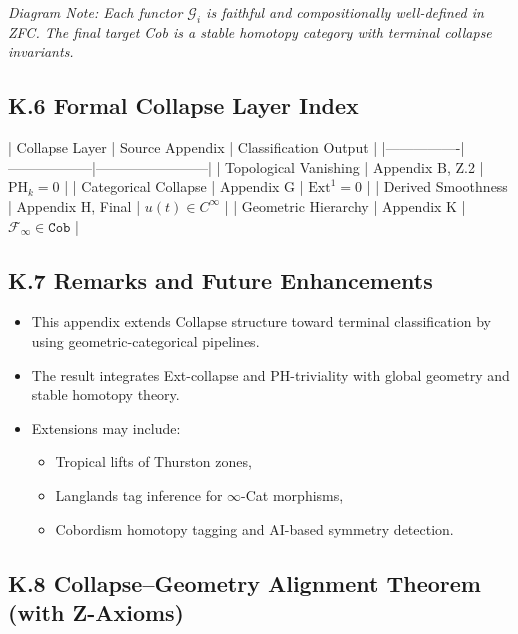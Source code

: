 \documentclass[11pt]{article}
\begin{document}
\begin{axiom}
\begin{axiom}
\textit{Diagram Note: Each functor \( \mathcal{G}_i \) is faithful and compositionally well-defined in ZFC.  
The final target Cob is a stable homotopy category with terminal collapse invariants.}

\subsection*{K.6 Formal Collapse Layer Index}

| Collapse Layer | Source Appendix | Classification Output |
|----------------|------------------|------------------------|
| Topological Vanishing | Appendix B, Z.2 | \( \mathrm{PH}_k = 0 \) |
| Categorical Collapse | Appendix G | \( \mathrm{Ext}^1 = 0 \) |
| Derived Smoothness | Appendix H, Final | \( u(t) \in C^\infty \) |
| Geometric Hierarchy | Appendix K | \( \mathcal{F}_\infty \in \texttt{Cob} \) |

\subsection*{K.7 Remarks and Future Enhancements}

\begin{itemize}
  \item This appendix extends Collapse structure toward terminal classification by using geometric-categorical pipelines.
  \item The result integrates Ext-collapse and PH-triviality with global geometry and stable homotopy theory.
  \item Extensions may include:
  \begin{itemize}
    \item Tropical lifts of Thurston zones,
    \item Langlands tag inference for \( \infty \)-Cat morphisms,
    \item Cobordism homotopy tagging and AI-based symmetry detection.
  \end{itemize}
\end{itemize}

\subsection*{K.8 Collapse–Geometry Alignment Theorem (with Z-Axioms)}


\end{axiom}
\end{axiom}
\end{document}
